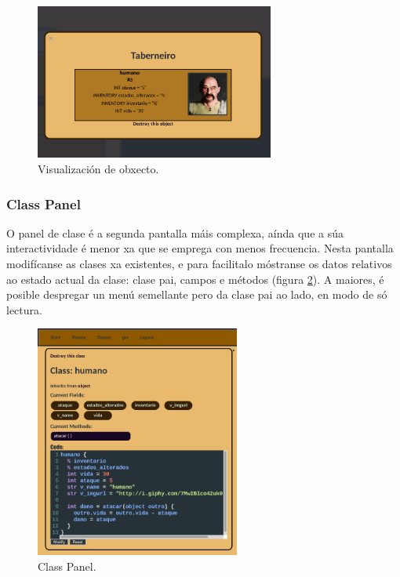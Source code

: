 \begin{figure}
\centerline{\includegraphics[width=0.7\textwidth]{figuras/demiurgo_object.png}}
\caption{Visualización de obxecto.}
\label{fig:demiurgoobject}
\end{figure}

\subsubsection{Class Panel}
O panel de clase é a segunda pantalla máis complexa, aínda que a súa
interactividade é menor xa que se emprega con menos frecuencia. Nesta pantalla
modifícanse as clases xa existentes, e para facilitalo móstranse os datos
relativos ao estado actual da clase: clase pai, campos e métodos (figura
\ref{fig:demiurgoclasspanel}). A maiores, é posible despregar un menú semellante
pero da clase pai ao lado, en modo de só lectura.

\begin{figure}
\centerline{\includegraphics[width=0.6\textwidth]{figuras/demiurgo_classpanel.png}}
\caption{Class Panel.}
\label{fig:demiurgoclasspanel}
\end{figure}

